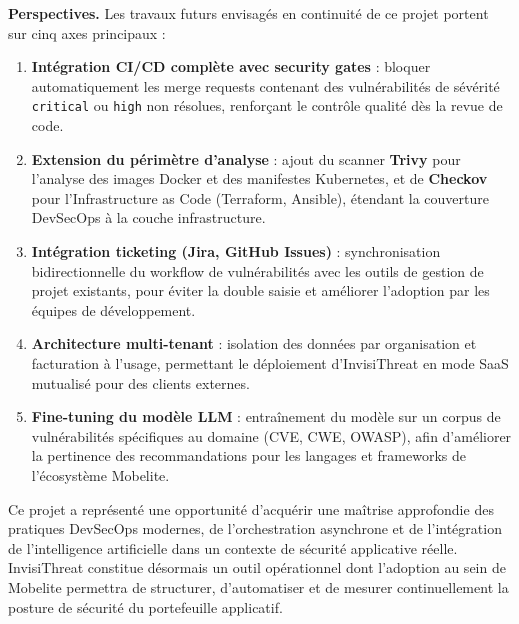 \medskip
\noindent \textbf{Perspectives.} Les travaux futurs envisagés en continuité de ce projet portent sur cinq axes principaux :

\begin{enumerate}
  \item \textbf{Intégration CI/CD complète avec security gates} : bloquer automatiquement les merge requests contenant des vulnérabilités de sévérité \texttt{critical} ou \texttt{high} non résolues, renforçant le contrôle qualité dès la revue de code.

  \item \textbf{Extension du périmètre d'analyse} : ajout du scanner \textbf{Trivy} pour l'analyse des images Docker et des manifestes Kubernetes, et de \textbf{Checkov} pour l'Infrastructure as Code (Terraform, Ansible), étendant la couverture DevSecOps à la couche infrastructure.

  \item \textbf{Intégration ticketing (Jira, GitHub Issues)} : synchronisation bidirectionnelle du workflow de vulnérabilités avec les outils de gestion de projet existants, pour éviter la double saisie et améliorer l'adoption par les équipes de développement.

  \item \textbf{Architecture multi-tenant} : isolation des données par organisation et facturation à l'usage, permettant le déploiement d'InvisiThreat en mode SaaS mutualisé pour des clients externes.

  \item \textbf{Fine-tuning du modèle LLM} : entraînement du modèle sur un corpus de vulnérabilités spécifiques au domaine (CVE, CWE, OWASP), afin d'améliorer la pertinence des recommandations pour les langages et frameworks de l'écosystème Mobelite.
\end{enumerate}

\medskip
\noindent Ce projet a représenté une opportunité d'acquérir une maîtrise approfondie des pratiques DevSecOps modernes, de l'orchestration asynchrone et de l'intégration de l'intelligence artificielle dans un contexte de sécurité applicative réelle. InvisiThreat constitue désormais un outil opérationnel dont l'adoption au sein de Mobelite permettra de structurer, d'automatiser et de mesurer continuellement la posture de sécurité du portefeuille applicatif.
